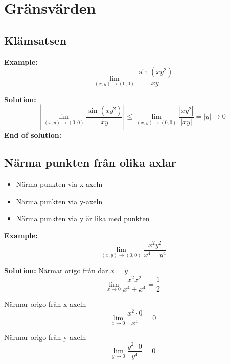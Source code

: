 

\section{Gränsvärden}

\subsection{Klämsatsen}
\textbf{Example:}
\begin{equation*}
    \lim_{(x,y)\to(0,0)} \frac{\sin(xy^2)}{xy}
\end{equation*}

\textbf{Solution:}
\begin{equation*}
    \left|\lim_{(x,y)\to(0,0)} \frac{\sin(xy^2)}{xy}\right| \leq  
    \lim_{(x,y)\to(0,0)} \frac{|xy^2|}{|xy|} = |y| \to 0
\end{equation*}
\textbf{End of solution:}


\subsection{Närma punkten från olika axlar}
\begin{itemize}
    \item Närma punkten via x-axeln
    \item Närma punkten via y-axeln
    \item Närma punkten via y är lika med punkten
\end{itemize}

\textbf{Example:}
\begin{equation*}
    \lim_{(x,y)\to(0,0)} \frac{x^2y^2}{x^4+y^4}
\end{equation*}

\textbf{Solution:}
Närmar origo från där $x=y$
\begin{equation*}
    \lim_{x\to0} \frac{x^2x^2}{x^4+x^4} = \frac{1}{2}
\end{equation*}

Närmar origo från x-axeln
\begin{equation*}
    \lim_{x\to0} \frac{x^2\cdot0}{x^4} = 0
\end{equation*}

Närmar origo från y-axeln
\begin{equation*}
    \lim_{y\to0} \frac{y^2\cdot0}{y^4} = 0
\end{equation*}

